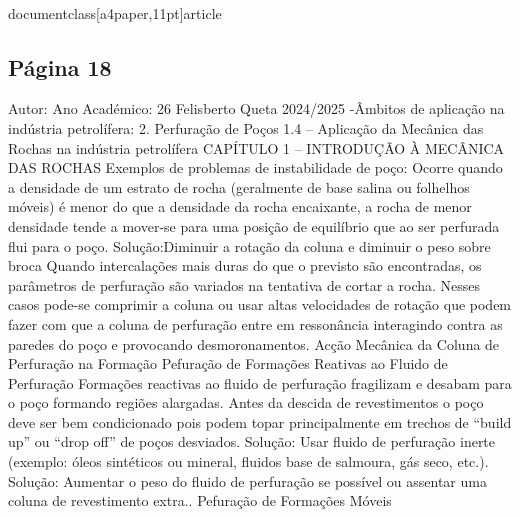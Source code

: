 \\documentclass[a4paper,11pt]{article}
\begin{document}
\subsection*{Página 18}
Autor:
Ano Académico:
26
Felisberto Queta
2024/2025
-Âmbitos de aplicação na indústria petrolífera:
2. Perfuração de Poços
1.4 – Aplicação da Mecânica das Rochas na indústria petrolífera
CAPÍTULO 1 – INTRODUÇÃO À MECÂNICA DAS ROCHAS
Exemplos de problemas de instabilidade de poço:
Ocorre quando a densidade de um 
estrato de rocha (geralmente de base 
salina ou folhelhos móveis) é menor do 
que a densidade da rocha encaixante, a 
rocha de menor densidade tende a 
mover-se para uma posição de equilíbrio 
que ao ser perfurada flui para o poço.
Solução:Diminuir a rotação da coluna e 
diminuir o peso sobre broca
Quando intercalações mais duras do que o 
previsto são encontradas, os parâmetros 
de perfuração são variados na tentativa de 
cortar a rocha. Nesses casos pode-se 
comprimir a coluna ou usar altas 
velocidades de rotação que podem fazer 
com que a coluna de perfuração entre em 
ressonância interagindo contra as paredes 
do poço e provocando desmoronamentos.
Acção Mecânica
da Coluna de
Perfuração na
Formação
Pefuração de 
Formações 
Reativas ao 
Fluido de 
Perfuração
Formações reactivas ao fluido de perfuração 
fragilizam e desabam para o poço formando 
regiões alargadas. Antes da descida de 
revestimentos o poço deve ser bem 
condicionado pois podem topar 
principalmente em trechos de “build up” ou 
“drop off” de poços desviados.
Solução: Usar fluido de perfuração inerte 
(exemplo: óleos sintéticos ou mineral, 
fluidos base de salmoura, gás seco, etc.).
Solução: Aumentar o peso do fluido 
de perfuração se possível ou 
assentar uma coluna de 
revestimento extra..
Pefuração de 
Formações 
Móveis
\end{document}
